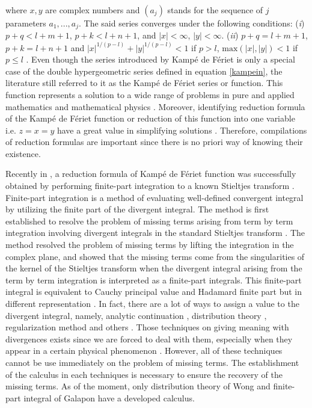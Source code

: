 where $x,y$ are complex numbers and $(a_j)$ stands for the sequence of $j$ parameters $a_1, ..., a_j$. The said series converges under the following conditions: ({\it i}) $p+q < l+m+1$, $p+k < l+n+1$, and $|x| < \infty$, $|y| < \infty$. ({\it ii}) $p+q = l+m+1$, $p+k = l+n+1$ and $|x|^{1/(p-l)} + |y|^{1/(p-l)} < 1$ if $p > l$, $\mbox{max}(|x|,|y|)<1$ if $p\leq l$ \cite{srivastava1976integral}. Even though the series introduced by Kampé de Fériet is only a special case of the double hypergeometric series defined in equation \eqref{kampein}, the literature still referred to it as the Kampé de Fériet series or function.  This function represents a solution to a wide range of problems in pure and applied mathematics and mathematical physics \cite{alder1956study, reynolds1964some,exton1976multiple, exton1978handbook, ancarani2010derivatives}. Moreover, identifying reduction formula of the Kampé de Fériet function or reduction of this function into one variable i.e. $z=x=y$  have a great value in simplifying solutions \cite{cvijovic2010reduction}. Therefore, compilations of reduction formulas \cite{miller2006summations, srivastava1985multiple, exton1998register} are important since there is no priori way of knowing their existence. 

Recently in \cite{SPP-2020-2G-03}, a reduction formula of Kampé de Fériet function was successfully obtained by performing finite-part integration \cite{galapon2017problem} to a known Stieltjes transform \cite{saxena1959study}. Finite-part integration is a method of evaluating well-defined convergent integral by utilizing the finite part of the divergent integral. The method is first established to resolve the problem of missing terms arising from term by term integration involving divergent integrals in the standard Stieltjes transform \cite{mcclure2016explicit}. The method resolved the problem of missing terms by lifting the integration in the complex plane, and showed that the missing terms come from the singularities of the kernel of the Stieltjes transform when the divergent integral arising from the term by term integration is interpreted as a finite-part integrals. This finite-part integral is equivalent to Cauchy principal value \cite{pipkin1991course} and Hadamard finite part \cite{hadamard1923lectures} but in different representation \cite{galapon2016cauchy}. In fact, there are a lot of ways to assign a value to the divergent integral, namely,  analytic continuation \cite{RevModPhys.47.849},  distribution theory \cite{wong2016distributional}, regularization method \cite{shiekh1990zeta} and others \cite{laforgia2009theory, caianiello1973generalized, costin2014foundational}. Those techniques on giving meaning with divergences exists since we are forced to deal with them, especially when they appear in a certain physical phenomenon \cite{bonnet1999boundary, frankel2006generalizing, frankel2007regularization}. However, all of these techniques cannot be use immediately on the problem of missing terms. The establishment of the calculus in each techniques is necessary to ensure the recovery of the missing terms. As of the moment, only distribution theory of Wong \cite{wong2016distributional} and finite-part integral of Galapon \cite{galapon2017problem} have a developed calculus.

